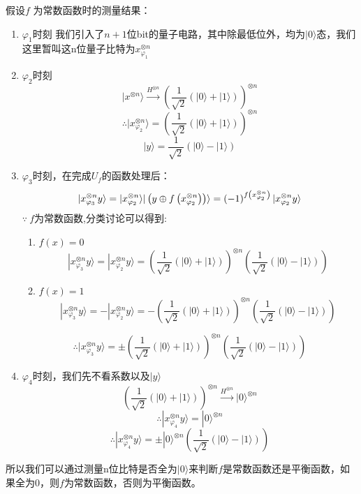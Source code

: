 \documentclass[11pt]{article}
\begin{document}
假设$f$ 为常数函数时的测量结果：
\begin{enumerate}
    \item $\varphi_1$时刻
    我们引入了$n+1$位bit的量子电路，其中除最低位外，均为$|0\rangle$态，我们这里暂叫这n位量子比特为$x_{\varphi_1}^{\otimes n}$
    \item $\varphi_2$时刻
    \[ |x^{\otimes n}\rangle \stackrel{{H^{\otimes n}}}\longrightarrow \left(\frac{1}{\sqrt{2}}\left(|0\rangle + |1\rangle \right)\right)^{\otimes n} \]
    \[\therefore |x_{\varphi_2}^{\otimes n}\rangle =\left(\frac{1}{\sqrt{2}}\left(|0\rangle + |1\rangle \right)\right)^{\otimes n}\]
    \[|y\rangle = \frac{1}{\sqrt{2}}\left(|0\rangle - |1\rangle \right) \]
    \item $\varphi_3$时刻，在完成$U_f$的函数处理后：
    \[|x_{\varphi_3}^{\otimes n}y\rangle =  |x_{\varphi_2}^{\otimes n}\rangle | \left(y \oplus f\left(x_{\varphi_2}^{\otimes n}\right)\right)\rangle \\
    = \left(-1\right)^{f\left(x_{\varphi_2}^{\otimes n}\right)}|x_{\varphi_2}^{\otimes n} y\rangle 
    \]
    $\because \ f$为常数函数,分类讨论可以得到:
    \begin{enumerate}
        \item $f(x) = 0$
           \[ |x_{\varphi_3}^{\otimes n}y\rangle = |x_{\varphi_2}^{\otimes n}y\rangle = \left(\frac{1}{\sqrt{2}}\left(|0\rangle + |1\rangle \right)\right)^{\otimes n} \left(\frac{1}{\sqrt{2}}\left(|0\rangle - |1\rangle \right)\right)\]
        \item $f(x) = 1$
           \[ |x_{\varphi_3}^{\otimes n}y\rangle = - |x_{\varphi_2}^{\otimes n}y\rangle = - \left(\frac{1}{\sqrt{2}}\left(|0\rangle + |1\rangle \right)\right)^{\otimes n} \left(\frac{1}{\sqrt{2}}\left(|0\rangle - |1\rangle \right)\right)\]
    \end{enumerate}
    
    \[\therefore |x_{\varphi_3}^{\otimes n}y\rangle = \pm \left(\frac{1}{\sqrt{2}}\left(|0\rangle + |1\rangle \right)\right)^{\otimes n} \left(\frac{1}{\sqrt{2}}\left(|0\rangle - |1\rangle \right)\right)\]
    
    \item $\varphi_4$时刻，我们先不看系数以及$|y\rangle$
        \[ \left(\frac{1}{\sqrt{2}}\left(|0\rangle + |1\rangle \right)\right)^{\otimes n} \stackrel{{H^{\otimes n}}}\longrightarrow  |0\rangle^{\otimes n} \]
        \[\therefore  |x_{\varphi_4}^{\otimes n}y\rangle = |0\rangle^{\otimes n} \]
        \[\therefore |x_{\varphi_4}^{\otimes n}y\rangle = \pm |0\rangle^{\otimes n} \left(\frac{1}{\sqrt{2}}\left(|0\rangle - |1\rangle \right)\right)\]
\end{enumerate}
所以我们可以通过测量n位比特是否全为$|0\rangle$来判断$f$是常数函数还是平衡函数，如果全为0，则$f$为常数函数，否则为平衡函数。
\end{document}
